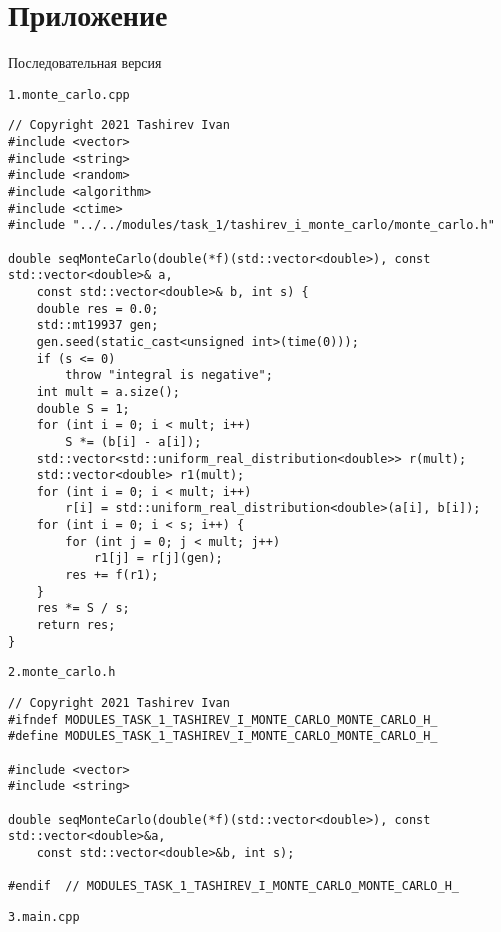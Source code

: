 \documentclass{report}
\begin{document}
\section*{Приложение}
\par Последовательная версия
\par \verb|1.monte_carlo.cpp|
\begin{lstlisting}
// Copyright 2021 Tashirev Ivan
#include <vector>
#include <string>
#include <random>
#include <algorithm>
#include <ctime>
#include "../../modules/task_1/tashirev_i_monte_carlo/monte_carlo.h"

double seqMonteCarlo(double(*f)(std::vector<double>), const std::vector<double>& a,
    const std::vector<double>& b, int s) {
    double res = 0.0;
    std::mt19937 gen;
    gen.seed(static_cast<unsigned int>(time(0)));
    if (s <= 0)
        throw "integral is negative";
    int mult = a.size();
    double S = 1;
    for (int i = 0; i < mult; i++)
        S *= (b[i] - a[i]);
    std::vector<std::uniform_real_distribution<double>> r(mult);
    std::vector<double> r1(mult);
    for (int i = 0; i < mult; i++)
        r[i] = std::uniform_real_distribution<double>(a[i], b[i]);
    for (int i = 0; i < s; i++) {
        for (int j = 0; j < mult; j++)
            r1[j] = r[j](gen);
        res += f(r1);
    }
    res *= S / s;
    return res;
}
\end{lstlisting}
\par \verb|2.monte_carlo.h|
\begin{lstlisting}
// Copyright 2021 Tashirev Ivan
#ifndef MODULES_TASK_1_TASHIREV_I_MONTE_CARLO_MONTE_CARLO_H_
#define MODULES_TASK_1_TASHIREV_I_MONTE_CARLO_MONTE_CARLO_H_

#include <vector>
#include <string>

double seqMonteCarlo(double(*f)(std::vector<double>), const std::vector<double>&a,
    const std::vector<double>&b, int s);

#endif  // MODULES_TASK_1_TASHIREV_I_MONTE_CARLO_MONTE_CARLO_H_
\end{lstlisting}
\par \verb|3.main.cpp|
\end{document}
